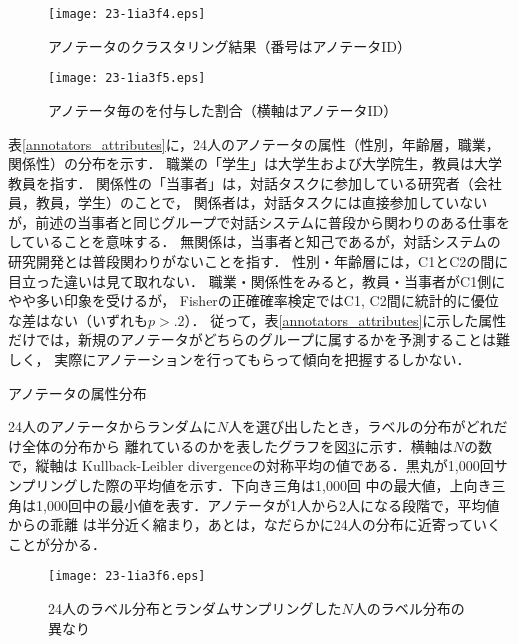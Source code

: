 \documentclass[japanese]{jnlp_1.4}
\newcommand{\maru}{}
\newcommand{\batsu}{}
\newcommand{\sankaku}{}
\begin{document}
\begin{figure}[b]
\begin{center}
\texttt{[image: 23-1ia3f4.eps]}
\end{center}
\caption{アノテータのクラスタリング結果（番号はアノテータID）}\label{cluster}
\end{figure}
\begin{figure}[b]
\begin{center}
\texttt{[image: 23-1ia3f5.eps]}
\end{center}
\caption{アノテータ毎の\maru \sankaku \batsu を付与した割合（横軸はアノテータID）}
\label{wariai_distribution2}
\end{figure}

表\ref{annotators_attributes}に，24人のアノテータの属性（性別，年齢層，職業，関係性）の分布を示す．
職業の「学生」は大学生および大学院生，教員は大学教員を指す．
関係性の「当事者」は，対話タスクに参加している研究者（会社員，教員，学生）のことで，
関係者は，対話タスクには直接参加していないが，前述の当事者と同じグループで対話システムに普段から関わりのある仕事をしていることを意味する．
無関係は，当事者と知己であるが，対話システムの研究開発とは普段関わりがないことを指す．
性別・年齢層には，C1とC2の間に目立った違いは見て取れない．
職業・関係性をみると，教員・当事者がC1側にやや多い印象を受けるが，
Fisherの正確確率検定ではC1, C2間に統計的に優位な差はない（いずれも$p>.2$）．
従って，表\ref{annotators_attributes}に示した属性だけでは，新規のアノテータがどちらのグループに属するかを予測することは難しく，
実際にアノテーションを行ってもらって傾向を把握するしかない．

\begin{table}[b]
\caption{アノテータの属性分布}
\label{annotators_attributes}

\end{table}

24人のアノテータからランダムに$N$人を選び出したとき，ラベルの分布がどれだけ全体の分布から
離れているのかを表したグラフを図\ref{plot}に示す．横軸は$N$の数で，縦軸は Kullback-Leibler
divergenceの対称平均の値である．黒丸が1,000回サンプリングした際の平均値を示す．下向き三角は1,000回
中の最大値，上向き三角は1,000回中の最小値を表す．アノテータが1人から2人になる段階で，平均値からの乖離
は半分近く縮まり，あとは，なだらかに24人の分布に近寄っていくことが分かる．

\begin{figure}[b]
\begin{center}
\texttt{[image: 23-1ia3f6.eps]}
\end{center}
\caption{24人のラベル分布とランダムサンプリングした$N$人のラベル分布の異なり}
\label{plot}
\end{figure}
\end{document}
